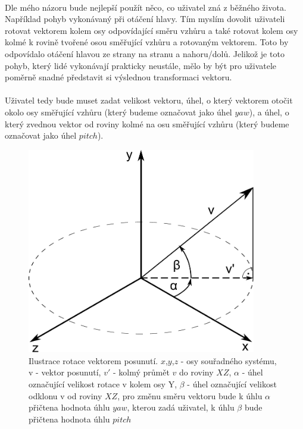 \documentclass[11pt,twoside,a4paper]{book}
\begin{document}
\paragraph{}
Dle mého názoru bude nejlepší použít něco, co uživatel zná z běžného života. Například pohyb vykonávaný při otáčení hlavy. Tím myslím dovolit uživateli rotovat vektorem kolem osy odpovídající směru vzhůru a také rotovat kolem osy kolmé k rovině tvořené osou směřující vzhůru a rotovaným vektorem. Toto by odpovídalo otáčení hlavou ze strany na stranu a nahoru/dolů. Jelikož je toto pohyb, který lidé vykonávají prakticky neustále, mělo by být pro uživatele poměrně snadné představit si výslednou transformaci vektoru.
\paragraph{}
Uživatel tedy bude muset zadat velikost vektoru, úhel, o který vektorem otočit okolo osy směřující vzhůru (který budeme označovat jako úhel $yaw$), a úhel, o který zvednou vektor od roviny kolmé na osu směřující vzhůru (který budeme označovat jako úhel $pitch$).  

\begin{figure}[h]
	\begin{center}
		\includegraphics[width=10cm]{ilustrace/Il-9-1}
		\caption{Ilustrace rotace vektorem posunutí. $x$,$y$,$z$ - osy souřadného systému, v - vektor posunutí, $v'$ - kolmý průmět $v$ do roviny $XZ$, $\alpha$ - úhel označující velikost rotace v kolem osy Y, $\beta$ - úhel označující velikost odklonu v od roviny $XZ$, pro změnu směru vektoru bude k úhlu $\alpha$ přičtena hodnota úhlu $yaw$, kterou zadá uživatel, k úhlu $\beta$ bude přičtena hodnota úhlu $pitch$}
		\label{fig:9-1}
	\end{center}
\end{figure}
\end{document}

